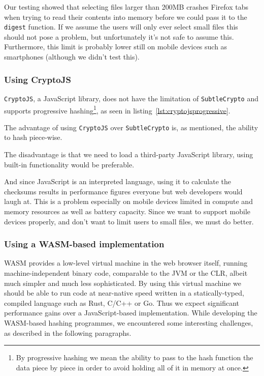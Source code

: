 

Our testing showed that selecting files larger than 200MB crashes Firefox tabs when trying to read their contents
into memory before we could pass it to the \texttt{digest} function.
If we assume the users will only ever select small files this should not pose a problem, but unfortunately it's not safe to assume this.
Furthermore, this limit is probably lower still on mobile devices such as smartphones (although we didn't test this).

\subsubsection{Using CryptoJS}
\label{subsec:cryptojs}
\texttt{CryptoJS}, a JavaScript library,
does not have the limitation of \texttt{SubtleCrypto} and supports progressive hashing\footnote{
By progressive hashing we mean the ability to pass to the hash function the data piece by piece in order to avoid holding all of it in memory at once.},
as seen in listing~\ref{lst:cryptojsprogressive}.



The advantage of using \texttt{CryptoJS} over \texttt{SubtleCrypto} is, as mentioned, the ability to hash piece-wise.

The disadvantage is that we need to load a third-party JavaScript library, using built-in functionality would be preferable.

And since JavaScript is an interpreted language, using it to calculate the checksums results in performance figures everyone but web developers would laugh at.
This is a problem especially on mobile devices limited in compute and memory resources as well as battery capacity.
Since we want to support mobile devices properly, and don't want to limit users to small files, we must do better.

\subsubsection{Using a WASM-based implementation}
\label{subsec:wasmhashing}
\gls{WASM} provides a low-level virtual machine in the web browser itself,
running machine-independent binary code, comparable to the \gls{JVM} or the \gls{CLR},
albeit much simpler and much less sophisticated.
By using this virtual machine we should be able to run code at near-native speed written in a statically-typed, compiled language such as Rust, C/C++ or Go.
Thus we expect significant performance gains over a JavaScript-based implementation.
While developing the \gls{WASM}-based hashing programmes, we encountered some interesting challenges, as described in the following paragraphs.

